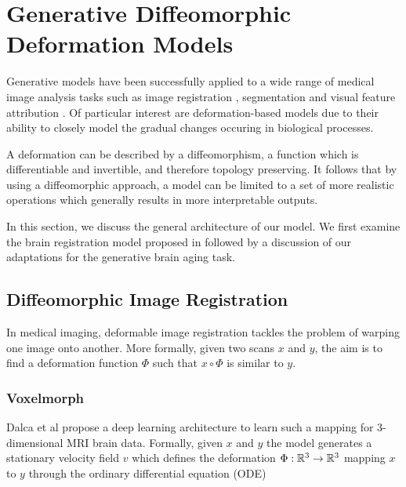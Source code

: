 \chapter{Generative Diffeomorphic Deformation Models}
Generative models have been successfully applied to a wide range of medical image analysis tasks such as image registration \cite{balakrishnan2019voxelmorph}, segmentation \cite{dong2017automatic} and visual feature attribution \cite{baumgartner2018visual}. Of particular interest are deformation-based models due to their ability to closely model the gradual changes occuring in biological processes.

A deformation can be described by a diffeomorphism, a function which is differentiable and invertible, and therefore topology preserving. It follows that by using a diffeomorphic approach, a model can be limited to a set of more realistic operations which generally results in more interpretable outputs.

In this section, we discuss the general architecture of our model. We first examine the brain registration model proposed in \cite{balakrishnan2019voxelmorph} \cite{dalca2018unsupervised} followed by a discussion of our adaptations for the generative brain aging task.

\section{Diffeomorphic Image Registration}
\label{chap:voxelmorph}
In medical imaging, deformable image registration tackles the problem of warping one image onto another. More formally, given two scans $x$ and $y$, the aim is to find a deformation function $\Phi$ such that $x \circ \Phi$ is similar to $y$.

\subsection{Voxelmorph} \label{sec:vox}
Dalca et al \cite{dalca2018unsupervised} propose a deep learning architecture to learn such a mapping for 3-dimensional MRI brain data. Formally, given $x$ and $y$ the model generates a stationary velocity field $v$ which defines the deformation ${\Phi : \mathbb{R}^3 \rightarrow \mathbb{R}^3}$ mapping $x$ to $y$ through the ordinary differential equation (ODE)

